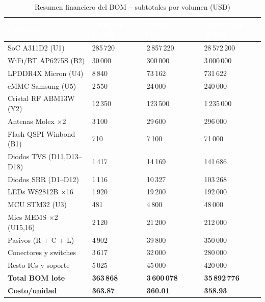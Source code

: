 \begin{table}[H]
  \centering
  \caption{Resumen financiero del BOM -- subtotales por volumen (USD)}
  \label{tab:bom_financiero}
  \begin{tabular}{L{4.5cm} R{2.8cm} R{3.0cm} R{3.0cm}}
    \toprule
    \textcolor{white}{\textbf{Categoría}} &
    \textcolor{white}{\textbf{1\,000 ud. (USD)}} &
    \textcolor{white}{\textbf{10\,000 ud. (USD)}} &
    \textcolor{white}{\textbf{100\,000 ud. (USD)}} \\
    \midrule
    SoC A311D2 (U1)          & 285\,720   & 2\,857\,220  & 28\,572\,200 \\
    WiFi/BT AP6275S (B2)     &  30\,000   &   300\,000   &  3\,000\,000 \\
    LPDDR4X Micron (U4)      &   8\,840   &    73\,162   &    731\,622 \\
    eMMC Samsung (U5)        &   2\,550   &    24\,000   &    240\,000 \\
    Cristal RF ABM13W (Y2)   &  12\,350   &   123\,500   &  1\,235\,000 \\
    Antenas Molex $\times$2  &   3\,100   &    29\,600   &    296\,000 \\
    Flash QSPI Winbond (B1)  &     710    &     7\,100   &     71\,000 \\
    Diodos TVS (D11,D13--D18)&   1\,417   &    14\,169   &    141\,686 \\
    Diodos SBR (D1--D12)     &   1\,116   &    10\,327   &    103\,268 \\
    LEDs WS2812B $\times$16  &   1\,920   &    19\,200   &    192\,000 \\
    MCU STM32 (U3)           &     481    &     4\,800   &     48\,000 \\
    Mics MEMS $\times$2 (U15,16) & 2\,120 &   21\,200   &    212\,000 \\
    Pasivos (R + C + L)      &   4\,902   &    39\,800   &    350\,000 \\
    Conectores y switches    &   3\,617   &    32\,000   &    280\,000 \\
    Resto ICs y soporte      &   5\,025   &    45\,000   &    420\,000 \\
    \midrule
    \textbf{Total BOM lote}  & \textbf{363\,868} & \textbf{3\,600\,078} & \textbf{35\,892\,776} \\
    \textbf{Costo/unidad}    & \textbf{363.87} & \textbf{360.01} & \textbf{358.93} \\
    \bottomrule
  \end{tabular}
\end{table}

